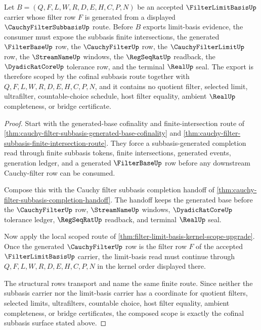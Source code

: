 \begin{theorem}
\label{thm:filter-limit-basis-cofinal-subbasis-scope}
Let $B=(Q,F,L,W,R,D,E,H,C,P,N)$ be an accepted $\FilterLimitBasisUp$ carrier whose filter row $F$ is generated from a displayed $\CauchyFilterSubbasisUp$ route. Before $B$ exports limit-basis evidence, the consumer must expose the subbasis finite intersections, the generated $\FilterBaseUp$ row, the $\CauchyFilterUp$ row, the $\CauchyFilterLimitUp$ row, the $\StreamNameUp$ windows, the $\RegSeqRatUp$ readback, the $\DyadicRatCoreUp$ tolerance row, and the terminal $\RealUp$ seal. The export is therefore scoped by the cofinal subbasis route together with $Q,F,L,W,R,D,E,H,C,P,N$, and it contains no quotient filter, selected limit, ultrafilter, countable-choice schedule, host filter equality, ambient $\RealUp$ completeness, or bridge certificate.
\end{theorem}
\begin{proof}
Start with the generated-base cofinality and finite-intersection route of \autoref{thm:cauchy-filter-subbasis-generated-base-cofinality} and \autoref{thm:cauchy-filter-subbasis-finite-intersection-route}. They force a subbasis-generated completion read through finite subbasis tokens, finite intersections, generated events, generation ledger, and a generated $\FilterBaseUp$ row before any downstream Cauchy-filter row can be consumed.

Compose this with the Cauchy filter subbasis completion handoff of \autoref{thm:cauchy-filter-subbasis-completion-handoff}. The handoff keeps the generated base before the $\CauchyFilterUp$ row, $\StreamNameUp$ windows, $\DyadicRatCoreUp$ tolerance ledger, $\RegSeqRatUp$ readback, and terminal $\RealUp$ seal.

Now apply the local scoped route of \autoref{thm:filter-limit-basis-kernel-scope-upgrade}. Once the generated $\CauchyFilterUp$ row is the filter row $F$ of the accepted $\FilterLimitBasisUp$ carrier, the limit-basis read must continue through $Q,F,L,W,R,D,E,H,C,P,N$ in the kernel order displayed there.

The structural rows transport and name the same finite route. Since neither the subbasis carrier nor the limit-basis carrier has a coordinate for quotient filters, selected limits, ultrafilters, countable choice, host filter equality, ambient completeness, or bridge certificates, the composed scope is exactly the cofinal subbasis surface stated above.
\end{proof}

